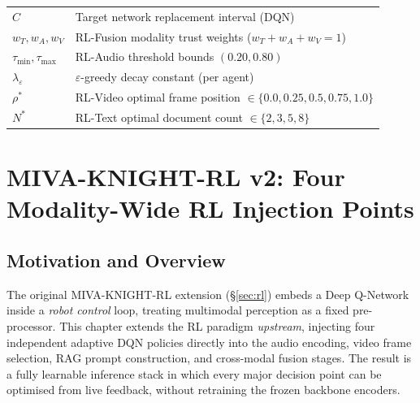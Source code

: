 \documentclass[12pt,a4paper]{article}
\theoremstyle{definition}
\theoremstyle{plain}
\theoremstyle{remark}
\begin{document}
\begin{table}[H]
\begin{tabular}{ll}
$C$ & Target network replacement interval (DQN) \\
$w_T, w_A, w_V$ & RL-Fusion modality trust weights ($w_T+w_A+w_V=1$) \\
$\tau_{\min}, \tau_{\max}$ & RL-Audio threshold bounds $(0.20, 0.80)$ \\
$\lambda_\varepsilon$ & $\varepsilon$-greedy decay constant (per agent) \\
$\rho^*$ & RL-Video optimal frame position $\in\{0.0,0.25,0.5,0.75,1.0\}$ \\
$N^*$ & RL-Text optimal document count $\in\{2,3,5,8\}$ \\
\bottomrule
\end{tabular}
\end{table}

\newpage
\section{MIVA-KNIGHT-RL v2: Four Modality-Wide RL Injection Points}
\label{sec:rl_injections}


\subsection{Motivation and Overview}

The original MIVA-KNIGHT-RL extension (\S\ref{sec:rl}) embeds a Deep Q-Network
inside a \emph{robot control} loop, treating multimodal perception as a fixed
pre-processor.  This chapter extends the RL paradigm \emph{upstream}, injecting
four independent adaptive DQN policies directly into the audio encoding, video
frame selection, RAG prompt construction, and cross-modal fusion stages.  The
result is a fully learnable inference stack in which every major decision point
can be optimised from live feedback, without retraining the frozen backbone
encoders.
\end{document}

